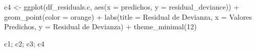 \documentclass[
  letterpaper,
  DIV=11,
  numbers=noendperiod]{scrartcl}
\newenvironment{Shaded}{\begin{snugshade}}{\end{snugshade}}
\newcommand{\AttributeTok}[1]{\textcolor[rgb]{0.40,0.45,0.13}{#1}}
\newcommand{\DecValTok}[1]{\textcolor[rgb]{0.68,0.00,0.00}{#1}}
\newcommand{\FunctionTok}[1]{\textcolor[rgb]{0.28,0.35,0.67}{#1}}
\newcommand{\NormalTok}[1]{\textcolor[rgb]{0.00,0.23,0.31}{#1}}
\newcommand{\OtherTok}[1]{\textcolor[rgb]{0.00,0.23,0.31}{#1}}
\newcommand{\SpecialCharTok}[1]{\textcolor[rgb]{0.37,0.37,0.37}{#1}}
\newcommand{\StringTok}[1]{\textcolor[rgb]{0.13,0.47,0.30}{#1}}
\begin{document}
\begin{Shaded}
\begin{Highlighting}[]
\NormalTok{c4 }\OtherTok{\textless{}{-}} \FunctionTok{ggplot}\NormalTok{(df\_residuals.c, }\FunctionTok{aes}\NormalTok{(}\AttributeTok{x =}\NormalTok{ predichos, }\AttributeTok{y =}\NormalTok{ residual\_deviance)) }\SpecialCharTok{+}
    \FunctionTok{geom\_point}\NormalTok{(}\AttributeTok{color =} \StringTok{\textquotesingle{}orange\textquotesingle{}}\NormalTok{) }\SpecialCharTok{+}
    \FunctionTok{labs}\NormalTok{(}\AttributeTok{title =} \StringTok{\textquotesingle{}Residual de Devianza\textquotesingle{}}\NormalTok{, }\AttributeTok{x =} \StringTok{\textquotesingle{}Valores Predichos\textquotesingle{}}\NormalTok{, }\AttributeTok{y =} \StringTok{\textquotesingle{}Residual de Devianza\textquotesingle{}}\NormalTok{) }\SpecialCharTok{+}
    \FunctionTok{theme\_minimal}\NormalTok{(}\DecValTok{12}\NormalTok{)}
\end{Highlighting}
\end{Shaded}

\begin{Shaded}
\begin{Highlighting}[]
\NormalTok{c1; c2; c3; c4}
\end{Highlighting}
\end{Shaded}
\end{document}
